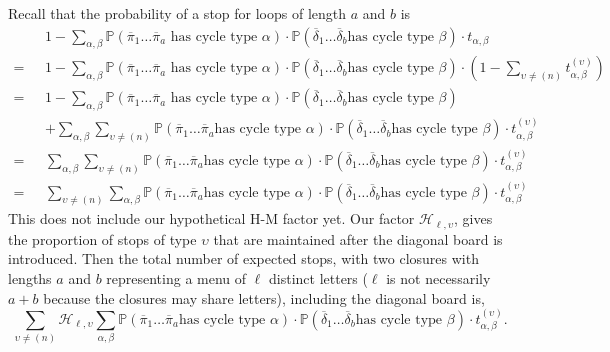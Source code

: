 Recall that the probability of a stop for loops of length $a$ and $b$ is
\begin{align*}
  &1-\sum_{\alpha,
  \beta}\mathbb{P}(\overline\pi_1\dots\overline\pi_a\text{ has cycle
      type
  }\alpha)\cdot\mathbb{P}(\overline\delta_1\dots\overline\delta_b\text{
  has cycle type }\beta)\cdot t_{\alpha, \beta}\\
  = \text{ }&1-\sum_{\alpha,
  \beta}\mathbb{P}(\overline\pi_1\dots\overline\pi_a\text{ has cycle
      type
  }\alpha)\cdot\mathbb{P}(\overline\delta_1\dots\overline\delta_b\text{
  has cycle type }\beta)\cdot (1 -
  \sum_{\upsilon\ne(n)}t_{\alpha,\beta}^{(\upsilon)})\\
  = \text{ }&1-\sum_{\alpha,
  \beta}\mathbb{P}(\overline\pi_1\dots\overline\pi_a\text{ has cycle
      type
  }\alpha)\cdot\mathbb{P}(\overline\delta_1\dots\overline\delta_b\text{
  has cycle type }\beta)
  \\\text{ }&+
  \sum_{\alpha,\beta}\sum_{\upsilon\ne(n)}\mathbb{P}(\overline\pi_1\dots\overline\pi_a\text{
      has cycle type
  }\alpha)\cdot\mathbb{P}(\overline\delta_1\dots\overline\delta_b\text{
  has cycle type }\beta)\cdot t_{\alpha,\beta}^{(\upsilon)}\\
  =\text{
  }&\sum_{\alpha,\beta}\sum_{\upsilon\ne(n)}\mathbb{P}(\overline\pi_1\dots\overline\pi_a\text{
      has cycle type
  }\alpha)\cdot\mathbb{P}(\overline\delta_1\dots\overline\delta_b\text{
  has cycle type }\beta)\cdot t_{\alpha,\beta}^{(\upsilon)}\\
  =\text{
  }&\sum_{\upsilon\ne(n)}\sum_{\alpha,\beta}\mathbb{P}(\overline\pi_1\dots\overline\pi_a\text{
      has cycle type
  }\alpha)\cdot\mathbb{P}(\overline\delta_1\dots\overline\delta_b\text{
  has cycle type }\beta)\cdot t_{\alpha,\beta}^{(\upsilon)}
\end{align*}
This does not include our hypothetical H-M factor yet. Our factor
$\mathcal{H}_{\ell,\upsilon}$, gives the proportion of stops of type
$\upsilon$ that
are maintained after the diagonal board is introduced. Then the total
number of expected stops, with two closures with lengths $a$ and $b$
representing a menu of $\ell$ distinct letters ($\ell$ is not necessarily
$a+b$ because the closures may share letters), including the diagonal board is,
\[
  \sum_{\upsilon\ne(n)}\mathcal{H}_{\ell,\upsilon}\sum_{\alpha,\beta}\mathbb{P}(\overline\pi_1\dots\overline\pi_a\text{
      has cycle type
  }\alpha)\cdot\mathbb{P}(\overline\delta_1\dots\overline\delta_b\text{
  has cycle type }\beta)\cdot t_{\alpha,\beta}^{(\upsilon)}.
\]
